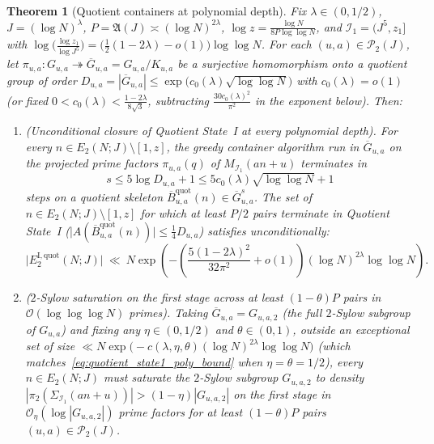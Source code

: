 \documentclass[11pt, a4paper]{article}
\theoremstyle{plain}
\newtheorem{theorem}{Theorem}[section]
\theoremstyle{definition}
\begin{document}
\begin{theorem}[Quotient containers at polynomial depth]\label{thm:quotient_container_polynomial_depth}
Fix $\lambda\in(0,1/2)$, $J=(\log N)^{\lambda}$, $P=\mathfrak{A}(J)\asymp(\log N)^{2\lambda}$, $\log z=\frac{\log N}{8P\log\log N}$, and $\mathcal{I}_1=(J^{5},z_1]$ with $\log\big(\frac{\log z_1}{\log J^{5}}\big)=\allowbreak\big(\frac12(1-2\lambda)-o(1)\big)\log\log N$. For each $(u,a)\in\mathcal{P}_2(J)$, let $\pi_{u,a}:\allowbreak G_{u,a}\twoheadrightarrow\allowbreak\overline{G}_{u,a}=\allowbreak G_{u,a}/K_{u,a}$ be a surjective homomorphism onto a quotient group of order $D_{u,a}=\allowbreak|\overline{G}_{u,a}|\le\allowbreak\exp\big(c_0(\lambda)\sqrt{\log\log N}\big)$ with $c_0(\lambda)=o(1)$ (or fixed $0<c_0(\lambda)<\frac{1-2\lambda}{8\sqrt{3}}$, subtracting $\frac{30c_0(\lambda)^{2}}{\pi^{2}}$ in the exponent below). Then:
\begin{enumerate}[label=(\alph*)]
    \item \emph{(Unconditional closure of Quotient State~I at every polynomial depth).} 
    For every $n\in E_2(N;J)\setminus[1,z]$, the greedy container algorithm run in $\overline{G}_{u,a}$ on the projected prime factors $\pi_{u,a}(q)$ of $M_{\mathcal{I}_1}(an+u)$ terminates in 
    \[
    s\le 5\log D_{u,a}+1\le 5c_0(\lambda)\sqrt{\log\log N}+1
    \]
    steps on a quotient skeleton $\overline{B}_{u,a}^{\mathrm{quot}}(n)\in\overline{G}_{u,a}^{s}$. The set of $n\in E_2(N;J)\setminus[1,z]$ for which at least $P/2$ pairs terminate in \emph{Quotient State~I} ($\big|A(\overline{B}_{u,a}^{\mathrm{quot}}(n))\big|\le\allowbreak\frac14 D_{u,a}$) satisfies unconditionally:
    \begin{equation}\label{eq:quotient_state1_poly_bound}
    \big|E_2^{\mathrm{I,quot}}(N;J)\big|\ \ll\ N\exp\!\left(-\left(\frac{5(1-2\lambda)^{2}}{32\pi^{2}}+o(1)\right)(\log N)^{2\lambda}\log\log N\right).
    \end{equation}
    
    \item \emph{($2$-Sylow saturation on the first stage across at least $(1-\theta)P$ pairs in $\mathcal{O}(\log\log\log N)$ primes).} 
    Taking $\overline{G}_{u,a}=G_{u,a,2}$ (the full $2$-Sylow subgroup of $G_{u,a}$) and fixing any $\eta\in(0,1/2)$ and $\theta\in(0,1)$, outside an exceptional set of size $\ll N\exp\big(-c(\lambda,\eta,\theta)(\log N)^{2\lambda}\log\log N\big)$ (which matches~\eqref{eq:quotient_state1_poly_bound} when $\eta=\theta=1/2$), every $n\in E_2(N;J)$ must saturate the $2$-Sylow subgroup $G_{u,a,2}$ to density $|\pi_2(\Sigma_{\mathcal{I}_1}(an+u))|>\allowbreak(1-\eta)|G_{u,a,2}|$ on the first stage in $\mathcal{O}_\eta(\log|G_{u,a,2}|)$ prime factors for at least $(1-\theta)P$ pairs $(u,a)\in\mathcal{P}_2(J)$.
    

\end{enumerate}
\end{theorem}
\end{document}

